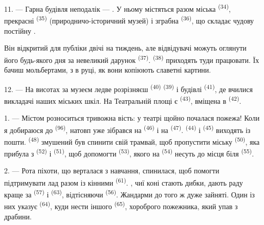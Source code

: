 \VUsaut{4.0mm}
\VUsaut{3.4mm}

11. --- Гарна будівля неподалік --- . У ньому містяться разом
міська  \textsuperscript{(34)}, прекрасні  \textsuperscript{(35)} (природничо-історичний музей) і зграбна
 \textsuperscript{(36)}, що складає чудову постійну
.

Він відкритий для публіки двічі на тиждень, але відвідувачі можуть оглянути
його будь-якого дня за невеликий дарунок 
\textsuperscript{(37)}.  \textsuperscript{(38)} приходять туди
працювати. Їх бачиш  мольбертами, з  в руці, як
вони копіюють славетні картини.

12. --- На висотах за музеєм ледве розрізняєш 
\textsuperscript{(40)}  \textsuperscript{(39)} і будівлі
 \textsuperscript{(41)}, де вчилися викладачі
наших міських шкіл. На Театральній площі є 
\textsuperscript{(43)}, вміщена в 
\textsuperscript{(42)}.

\VUsaut{5.0mm}
\VUsaut{3.0mm}

\VUsaut{3.4mm}

1. --- Містом розноситься тривожна вість: у театрі щойно почалася пожежа! Коли я
добираюся до  \textsuperscript{(96)}, натовп уже зібрався на
 \textsuperscript{(46)} і на 
\textsuperscript{(47)}.  \textsuperscript{(44)} і
 \textsuperscript{(45)} виходять із пошти.
 \textsuperscript{(48)} змушений був спинити свій трамвай, щоб
пропустити міську  \textsuperscript{(50)}, яка
прибула з  \textsuperscript{(52)} і 
\textsuperscript{(51)}, щоб допомогти  \textsuperscript{(53)},
якого на  \textsuperscript{(54)} несуть до місця біля
 \textsuperscript{(55)}.

2. --- Рота піхоти, що верталася з навчання, спинилася, щоб помогти підтримувати
лад разом із кінними  \textsuperscript{(61)}.
, чиї коні стають дибки, дають раду краще за 
\textsuperscript{(57)} і  \textsuperscript{(63)}, відтісняючи
 \textsuperscript{(56)}. Жандарми до того ж дуже зайняті. Один із
них указує  \textsuperscript{(64)}, куди нести іншого
 \textsuperscript{(65)}, хороброго пожежника, який упав з
драбини.

